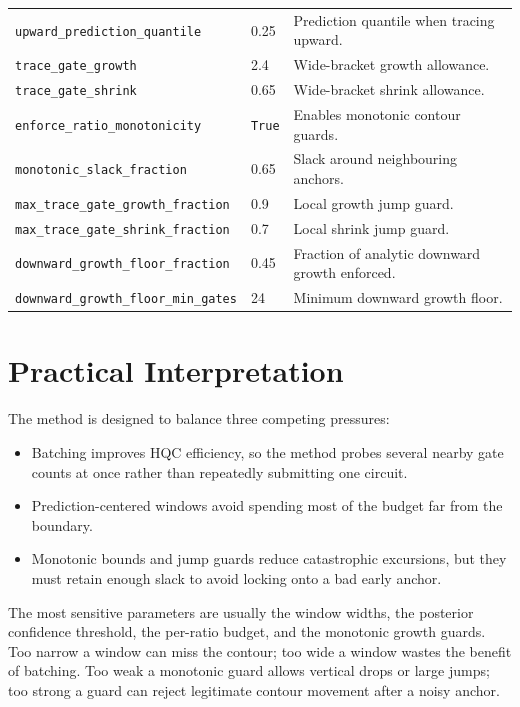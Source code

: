 \documentclass[11pt]{article}
\begin{document}
\begin{table}[h]
\begin{tabular}{lll}
\texttt{upward\_prediction\_quantile} & 0.25 & Prediction quantile when tracing upward. \\
\texttt{trace\_gate\_growth} & 2.4 & Wide-bracket growth allowance. \\
\texttt{trace\_gate\_shrink} & 0.65 & Wide-bracket shrink allowance. \\
\texttt{enforce\_ratio\_monotonicity} & \texttt{True} & Enables monotonic contour guards. \\
\texttt{monotonic\_slack\_fraction} & 0.65 & Slack around neighbouring anchors. \\
\texttt{max\_trace\_gate\_growth\_fraction} & 0.9 & Local growth jump guard. \\
\texttt{max\_trace\_gate\_shrink\_fraction} & 0.7 & Local shrink jump guard. \\
\texttt{downward\_growth\_floor\_fraction} & 0.45 & Fraction of analytic downward growth enforced. \\
\texttt{downward\_growth\_floor\_min\_gates} & 24 & Minimum downward growth floor. \\
\bottomrule
\end{tabular}
\end{table}

\section{Practical Interpretation}

The method is designed to balance three competing pressures:

\begin{itemize}[leftmargin=*]
    \item Batching improves HQC efficiency, so the method probes several nearby
    gate counts at once rather than repeatedly submitting one circuit.
    \item Prediction-centered windows avoid spending most of the budget far
    from the boundary.
    \item Monotonic bounds and jump guards reduce catastrophic excursions, but
    they must retain enough slack to avoid locking onto a bad early anchor.
\end{itemize}

The most sensitive parameters are usually the window widths, the posterior
confidence threshold, the per-ratio budget, and the monotonic growth guards.
Too narrow a window can miss the contour; too wide a window wastes the benefit
of batching. Too weak a monotonic guard allows vertical drops or large jumps;
too strong a guard can reject legitimate contour movement after a noisy anchor.
\end{document}
